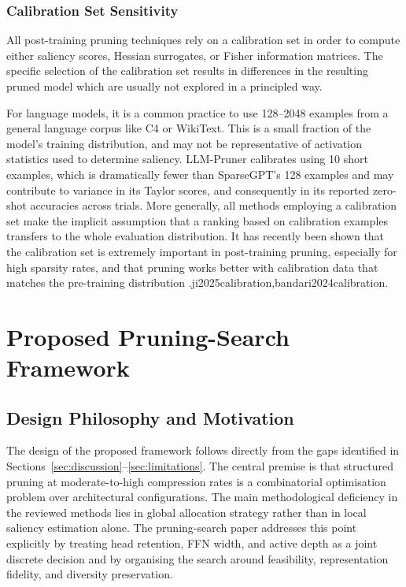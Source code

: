 \subsection{Calibration Set Sensitivity}
\label{subsec:calibration}

All post-training pruning techniques rely on a calibration set in order to compute either saliency scores, Hessian surrogates, or Fisher information matrices. The specific selection of the calibration set results in differences in the resulting pruned model which are usually not explored in a principled way.

For language models, it is a common practice to use 128–2048 examples from a general language corpus like C4 or WikiText. This is a small fraction of the model’s training distribution, and may not be representative of activation statistics used to determine saliency. LLM-Pruner calibrates using 10 short examples, which is dramatically fewer than SparseGPT's 128 examples and may contribute to variance in its Taylor scores, and consequently in its reported zero-shot accuracies across trials. More generally, all methods employing a calibration set make the implicit assumption that a ranking based on calibration examples transfers to the whole evaluation distribution. It has recently been shown that the calibration set is extremely important in post-training pruning, especially for high sparsity rates, and that pruning works better with calibration data that matches the pre-training distribution \cite{ji2025calibration,bandari2024calibration}.{ji2025calibration,bandari2024calibration}.

\fi
\ifdefined\RenderProposedPruningSearchFramework
\chapter{Proposed Pruning-Search Framework}
\label{sec:design}
\label{chap:proposed_pruning_search_framework}

\section{Design Philosophy and Motivation}
\label{subsec:design_philosophy}

The design of the proposed framework follows directly from the gaps identified in Sections~\ref{sec:discussion}--\ref{sec:limitations}. The central premise is that structured pruning at moderate-to-high compression rates is a combinatorial optimisation problem over architectural configurations. The main methodological deficiency in the reviewed methods lies in global allocation strategy rather than in local saliency estimation alone. The pruning-search paper addresses this point explicitly by treating head retention, FFN width, and active depth as a joint discrete decision and by organising the search around feasibility, representation fidelity, and diversity preservation.

